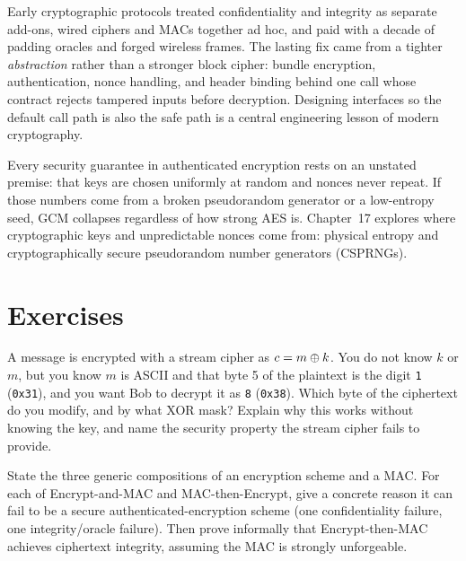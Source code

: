 \begin{aestheticbox}
Early cryptographic protocols treated confidentiality and integrity as separate add-ons, wired ciphers and MACs together ad hoc, and paid with a decade of padding oracles and forged wireless frames. The lasting fix came from a tighter \emph{abstraction} rather than a stronger block cipher: bundle encryption, authentication, nonce handling, and header binding behind one call whose contract rejects tampered inputs before decryption. Designing interfaces so the default call path is also the safe path is a central engineering lesson of modern cryptography.
\end{aestheticbox}

\begin{connectionbox}
Every security guarantee in authenticated encryption rests on an unstated premise: that keys are chosen uniformly at random and nonces never repeat. If those numbers come from a broken pseudorandom generator or a low-entropy seed, GCM collapses regardless of how strong AES is. Chapter~17 explores where cryptographic keys and unpredictable nonces come from: physical entropy and cryptographically secure pseudorandom number generators (CSPRNGs).
\end{connectionbox}

\section*{Exercises}

\begin{exercise}
A message is encrypted with a stream cipher as $c = m \oplus k$. You do not know $k$ or $m$, but you know $m$ is ASCII and that byte 5 of the plaintext is the digit \texttt{1} (\texttt{0x31}), and you want Bob to decrypt it as \texttt{8} (\texttt{0x38}). Which byte of the ciphertext do you modify, and by what XOR mask? Explain why this works without knowing the key, and name the security property the stream cipher fails to provide.
\end{exercise}

\begin{exercise}
State the three generic compositions of an encryption scheme and a MAC. For each of Encrypt-and-MAC and MAC-then-Encrypt, give a concrete reason it can fail to be a secure authenticated-encryption scheme (one confidentiality failure, one integrity/oracle failure). Then prove informally that Encrypt-then-MAC achieves ciphertext integrity, assuming the MAC is strongly unforgeable.
\end{exercise}


